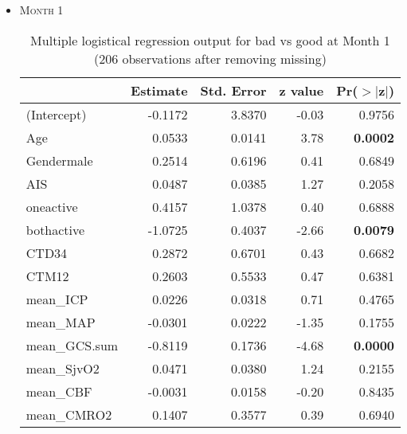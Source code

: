 \documentclass{article}
\begin{document}
\begin{itemize}
\item \textsc{Month 1}
\begin{table}[H]
\caption{Multiple logistical regression output for bad vs good at Month 1 (206 observations after removing missing)}
\centering
\begin{tabular}{lrrrr}
  \hline
 & Estimate & Std. Error & z value & Pr($>$$|$z$|$) \\ 
  \hline
(Intercept) & -0.1172 & 3.8370 & -0.03 & 0.9756 \\ 
  Age & 0.0533 & 0.0141 & 3.78 & {\bf 0.0002} \\ 
  Gendermale & 0.2514 & 0.6196 & 0.41 & 0.6849 \\ 
  AIS & 0.0487 & 0.0385 & 1.27 & 0.2058 \\ 
  oneactive & 0.4157 & 1.0378 & 0.40 & 0.6888 \\ 
  bothactive & -1.0725 & 0.4037 & -2.66 & {\bf 0.0079} \\ 
  CTD34 & 0.2872 & 0.6701 & 0.43 & 0.6682 \\ 
  CTM12 & 0.2603 & 0.5533 & 0.47 & 0.6381 \\ 
  mean\_ICP & 0.0226 & 0.0318 & 0.71 & 0.4765 \\ 
  mean\_MAP & -0.0301 & 0.0222 & -1.35 & 0.1755 \\ 
  mean\_GCS.sum & -0.8119 & 0.1736 & -4.68 & {\bf 0.0000} \\ 
  mean\_SjvO2 & 0.0471 & 0.0380 & 1.24 & 0.2155 \\ 
  mean\_CBF & -0.0031 & 0.0158 & -0.20 & 0.8435 \\ 
  mean\_CMRO2 & 0.1407 & 0.3577 & 0.39 & 0.6940 \\ 
   \hline
\end{tabular}
\end{table}





\end{itemize}
\end{document}
